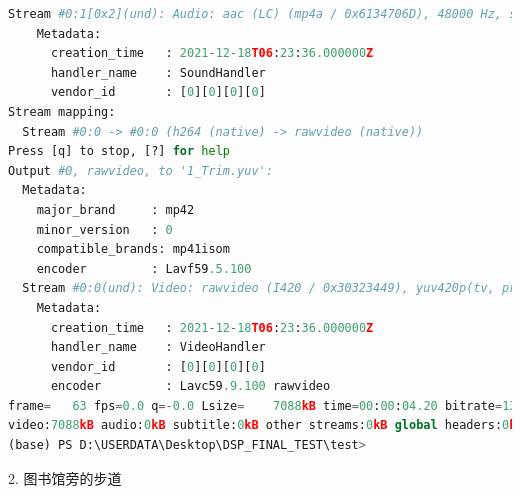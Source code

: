 \documentclass[10pt,UTF8]{ctexart}
\begin{document}
\begin{lstlisting}[language={python}]
  Stream #0:1[0x2](und): Audio: aac (LC) (mp4a / 0x6134706D), 48000 Hz, stereo, fltp, 180 kb/s (default)
    Metadata:
      creation_time   : 2021-12-18T06:23:36.000000Z
      handler_name    : SoundHandler
      vendor_id       : [0][0][0][0]
Stream mapping:
  Stream #0:0 -> #0:0 (h264 (native) -> rawvideo (native))
Press [q] to stop, [?] for help
Output #0, rawvideo, to '1_Trim.yuv':
  Metadata:
    major_brand     : mp42
    minor_version   : 0
    compatible_brands: mp41isom
    encoder         : Lavf59.5.100
  Stream #0:0(und): Video: rawvideo (I420 / 0x30323449), yuv420p(tv, progressive), 320x240 [SAR 17:40 DAR 17:30], q=2-31, 13824 kb/s, 15 fps, 15 tbn (default)
    Metadata:
      creation_time   : 2021-12-18T06:23:36.000000Z
      handler_name    : VideoHandler
      vendor_id       : [0][0][0][0]
      encoder         : Lavc59.9.100 rawvideo
frame=   63 fps=0.0 q=-0.0 Lsize=    7088kB time=00:00:04.20 bitrate=13824.0kbits/s dup=0 drop=60 speed=8.21x
video:7088kB audio:0kB subtitle:0kB other streams:0kB global headers:0kB muxing overhead: 0.000000%
(base) PS D:\USERDATA\Desktop\DSP_FINAL_TEST\test>
\end{lstlisting}

2. 图书馆旁的步道
\end{document}
